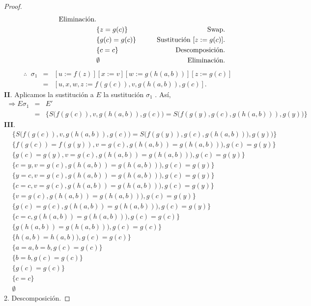 \documentclass{article}
\begin{document}
\begin{proof}
\begin{eqnarray*}
    \hspace*{1.45cm} \text{Eliminación.}\\
    & \{z = g(c)\} &
    \hspace*{1.94cm} \text{Swap.}\\
    & \{g(c) = g(c)\} &
    \hspace*{0.7cm} \text{Sustitución } [z := g(c)].\\
    & \{c = c\} &
    \hspace*{1.2cm} \text{Descomposición.}\\
    & \emptyset &
    \hspace*{1.45cm} \text{Eliminación.}
  \end{eqnarray*}
  \begin{eqnarray*}
    \therefore\;\; \sigma_{1} &=& [u := f(z)][x := v][w := g(h(a, b))][z := g(c)]\\
    &=& [u, x, w, z := f(g(c)), v, g(h(a, b)), g(c)].
  \end{eqnarray*}
  \textbf{II}. Aplicamos la sustitución a $E$ la sustitución $\sigma_{1}$ . Así,
  \begin{eqnarray*}
    \Rightarrow E \sigma_{1} &=& E'\\
    &=& \{S\big(f(g(c)), v, g(h(a, b)), g(c)\big) = S\big(f(g(y), g(c), g(h(a,b))), g(y)\big)\}
  \end{eqnarray*}
  \textbf{III}.
  \setcounter{equation}{0}
  \begin{eqnarray}
    & \{S\big(f(g(c)), v, g(h(a, b)), g(c)\big) = S\big(f(g(y)), g(c), g(h(a,b))), g(y)\big)\} &\\
    & \{f(g(c)) = f(g(y)), v = g(c), g(h(a, b)) = g(h(a,b))), g(c) = g(y)\} &\\
    & \{g(c) = g(y), v = g(c), g(h(a, b)) = g(h(a,b))), g(c) = g(y)\} &\\
    & \{c = y, v = g(c), g(h(a, b)) = g(h(a,b))), g(c) = g(y)\} &\\
    & \{y = c, v = g(c), g(h(a, b)) = g(h(a,b))), g(c) = g(y)\} &\\
    & \{c = c, v = g(c), g(h(a, b)) = g(h(a,b))), g(c) = g(y)\} &\\
    & \{v = g(c), g(h(a, b)) = g(h(a,b))), g(c) = g(y)\} &\\
    & \{g(c) = g(c), g(h(a, b)) = g(h(a,b))), g(c) = g(y)\} &\\
    & \{c = c, g(h(a, b)) = g(h(a,b))), g(c) = g(c)\} &\\
    & \{g(h(a, b)) = g(h(a,b))), g(c) = g(c)\} &\\
    & \{h(a, b) = h(a,b)), g(c) = g(c)\} &\\
    & \{a = a, b = b, g(c) = g(c)\} &\\
    & \{b = b, g(c) = g(c)\} &\\
    & \{ g(c) = g(c)\} &\\
    & \{ c = c\} &\\
    & \emptyset &
  \end{eqnarray}
  2. Descomposición.
  

\end{proof}
\end{document}
